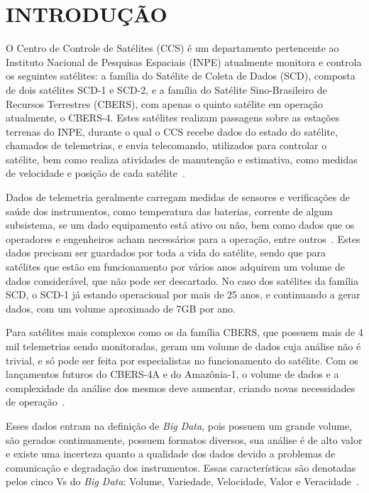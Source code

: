 
\chapter{INTRODUÇÃO}\label{ch:intro}

O Centro de Controle de Satélites (CCS) é um departamento pertencente ao Instituto Nacional de Pesquisas Espaciais (INPE) atualmente monitora e controla os seguintes satélites: a família do Satélite de Coleta de Dados (SCD), composta de dois satélites SCD-1 e SCD-2, e a família do Satélite Sino-Brasileiro de Recursos Terrestres (CBERS), com apenas o quinto satélite em operação atualmente, o CBERS-4.
Estes satélites realizam passagens sobre as estações terrenas do INPE, durante o qual o CCS recebe dados do estado do satélite, chamados de telemetrias, e envia telecomando, utilizados para controlar o satélite, bem como realiza atividades de manutenção e estimativa, como medidas de velocidade e posição de cada satélite~\cite{AzevedoAmbr:2010:ArSaTe}.

Dados de telemetria geralmente carregam medidas de sensores e verificações de saúde dos instrumentos, como temperatura das baterias, corrente de algum subsistema, se um dado equipamento está ativo ou não, bem como dados que os operadores e engenheiros acham necessários para a operação, entre outros~\cite{larsonSpaceMissionAnalysis1999}.
Estes dados precisam ser guardados por toda a vida do satélite, sendo que para satélites que estão em funcionamento por vários anos adquirem um volume de dados considerável, que não pode ser descartado.
No caso dos satélites da família SCD, o SCD-1 já estando operacional por mais de 25 anos, e continuando a gerar dados, com um volume aproximado de 7GB por ano.

Para satélites mais complexos como os da família CBERS, que possuem mais de 4 mil telemetrias sendo monitoradas, geram um volume de dados cuja análise não é trivial, e só pode ser feita por especialistas no funcionamento do satélite.
Com os lançamentos futuros do CBERS-4A e do Amazônia-1, o volume de dados e a complexidade da análise dos mesmos deve aumentar, criando novas necessidades de operação~\cite{JulioFoAmbrFerrLour:2017:ChImSp}.

Esses dados entram na definição de \textit{Big Data}, pois possuem um grande volume, são gerados continuamente, possuem formatos diversos, sua análise é de alto valor e existe uma incerteza quanto a qualidade dos dados devido a problemas de comunicação e degradação dos instrumentos.
Essas características são denotadas pelos cinco Vs do \textit{Big Data}: Volume, Variedade, Velocidade, Valor e Veracidade~\cite{kacfahemaniUnderstandableBigData2015}.

